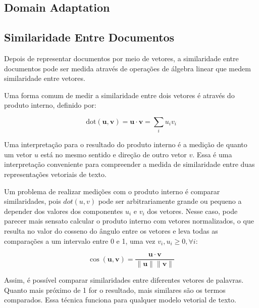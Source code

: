 \documentclass[
	12pt,				%
	openright,			%
	oneside,			%
	a4paper,			%
	english,			%
	french,				%
	spanish,			%
	brazil				%
	]{abntex2}
\begin{document}
\subsection{Domain Adaptation}



\subsection{Similaridade Entre Documentos}\label{subsec:similaridade-entre-documentos}

Depois de representar documentos por meio de vetores,
a similaridade entre documentos pode ser medida através de operações de álgebra linear que medem
similaridade entre vetores.

Uma forma comum de medir a similaridade entre dois vetores é através do produto interno, definido por:

\begin{equation}
\text{dot}(\mathbf{u}, \mathbf{v})  = \mathbf{u} \cdot \mathbf{v} = \sum_{i}u_{i}v_{i}
\label{eq:dot_product}
\end{equation}

Uma interpretação para o resultado do produto interno é a medição de quanto um vetor $u$ está no mesmo sentido e direção de outro vetor $v$. Essa é uma interpretação conveniente para compreender a medida de similaridade entre duas representações vetoriais de texto.

Um problema de realizar medições com o produto interno é comparar similaridades, pois $dot(u,v)$ pode ser arbitrariamente grande ou pequeno a depender dos valores dos componentes $u_i$ e $v_i$ dos vetores. Nesse caso, pode parecer mais sensato calcular o produto interno com vetores normalizados, o que resulta no valor do cosseno do ângulo entre os vetores e leva todas as comparações
a um intervalo entre 0 e 1, uma vez $v_i, u_i \geq 0, \forall i$:

\begin{equation}
\cos (\mathbf{u}, \mathbf{v})  = \frac{\mathbf{u} \cdot \mathbf{v}}{\|\mathbf{u}\| \|\mathbf{v}\|}
\label{eq:cosine_similarity}
\end{equation}

Assim, é possível comparar similaridades entre diferentes vetores de palavras.
Quanto mais próximo de 1 for o resultado, mais similares são os termos comparados.
Essa técnica funciona para qualquer modelo vetorial de texto.
\end{document}

